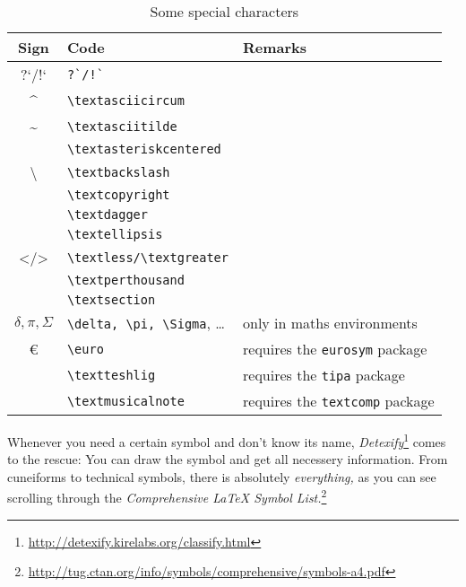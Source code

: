 \begin{table}[H]
	\center
	\begin{tabular}{cll}
		\toprule
		Sign & Code & Remarks \\
		\midrule
		?`/!` & \verb|?`/!`| & \\
		\textasciicircum & \verb|\textasciicircum| & \\
		\textasciitilde & \verb|\textasciitilde| & \\
		\textasteriskcentered & \verb|\textasteriskcentered| & \\
		\textbackslash & \verb|\textbackslash| & \\
		\textcopyright & \verb|\textcopyright| & \\
		\textdagger & \verb|\textdagger| & \\
		\textellipsis & \verb|\textellipsis| & \\
		\textless/\textgreater & \verb|\textless/\textgreater| & \\
		\textperthousand & \verb|\textperthousand| & \\
		\textsection & \verb|\textsection| & \\
		$\delta, \pi, \Sigma$ & \verb|\delta, \pi, \Sigma|, … & only in maths environments \\
		\euro & \verb|\euro| & requires the \texttt{eurosym} package \\
		\textteshlig & \verb|\textteshlig| & requires the \texttt{tipa} package \\
		\textmusicalnote & \verb|\textmusicalnote| & requires the \texttt{textcomp} package \\
		\bottomrule
	\end{tabular}
	\caption{Some special characters}
	\label{tbl:special-characters}
\end{table}
Whenever you need a certain symbol and don’t know its name, \emph{Detexify}\footnote{\url{http://detexify.kirelabs.org/classify.html}} comes to the rescue: You can draw the symbol and get all necessery information.
From cuneiforms to technical symbols, there is absolutely \emph{everything}\textit{,} as you can see scrolling through the \emph{Comprehensive \LaTeX{} Symbol List}\textit{.}\footnote{\url{http://tug.ctan.org/info/symbols/comprehensive/symbols-a4.pdf}}

